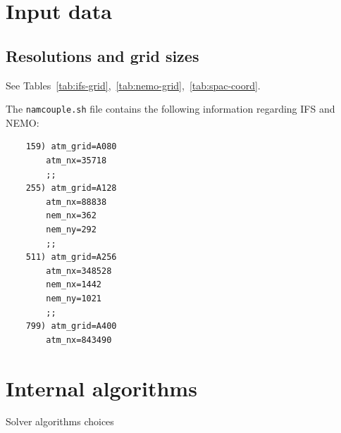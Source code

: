 \section{Input data}

\subsection{Resolutions and grid sizes}
See Tables~\ref{tab:ifs-grid},~\ref{tab:nemo-grid},~\ref{tab:spac-coord}.

The \texttt{namcouple.sh} file contains the following information regarding IFS and NEMO:

\begin{lstlisting}
    159) atm_grid=A080
        atm_nx=35718
        ;;
    255) atm_grid=A128
        atm_nx=88838
        nem_nx=362
        nem_ny=292
        ;;
    511) atm_grid=A256
        atm_nx=348528
        nem_nx=1442
        nem_ny=1021
        ;;
    799) atm_grid=A400
        atm_nx=843490  
\end{lstlisting}








\section{Internal algorithms}
Solver algorithms choices